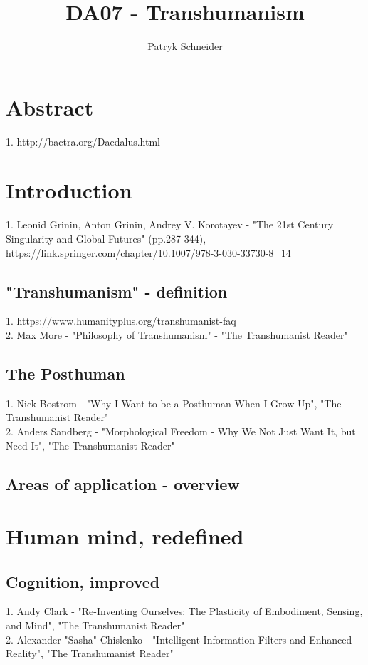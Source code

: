 \documentclass[10pt]{article}
\begin{document}
\author{Patryk Schneider}
\title{DA07 - Transhumanism}
\maketitle

\section{Abstract}
	1. http://bactra.org/Daedalus.html\\

\newpage

\section{Introduction}
	1. Leonid Grinin, Anton Grinin, Andrey V. Korotayev - "The 21st Century Singularity and Global Futures" (pp.287-344), https://link.springer.com/chapter/10.1007/978-3-030-33730-8\_14 \\
\subsection{"Transhumanism" - definition}
	1. https://www.humanityplus.org/transhumanist-faq \\
	2. Max More - "Philosophy of Transhumanism" - "The Transhumanist Reader"
\subsection{The Posthuman}
	1. Nick Bostrom - "Why I Want to be a Posthuman When I Grow Up", "The Transhumanist Reader"\\
	2. Anders Sandberg - "Morphological Freedom - Why We Not Just Want It, but Need It", "The Transhumanist Reader"
\subsection{Areas of application - overview}

\section{Human mind, redefined}
\subsection{Cognition, improved}
	1. Andy Clark  - "Re-Inventing Ourselves: The Plasticity of Embodiment, Sensing, and Mind", "The Transhumanist Reader"\\
	2. Alexander "Sasha" Chislenko - "Intelligent Information Filters and Enhanced Reality", "The Transhumanist Reader"
\end{document}
